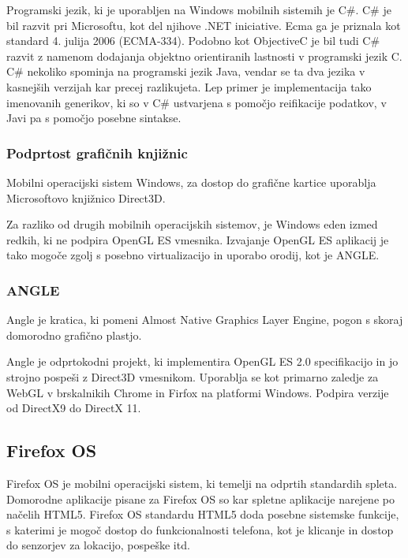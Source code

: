 Programski jezik, ki je uporabljen na Windows mobilnih sistemih je C\#. C\# je bil razvit pri Microsoftu, kot del njihove .NET iniciative. Ecma ga je priznala kot standard 4. julija 2006 (ECMA-334). Podobno kot ObjectiveC je bil tudi C\# razvit z namenom dodajanja objektno orientiranih lastnosti v programski jezik C. C\# nekoliko spominja na programski jezik Java, vendar se ta dva jezika v kasnejših verzijah kar precej razlikujeta. Lep primer je implementacija tako imenovanih generikov, ki so v C\# ustvarjena s pomočjo reifikacije podatkov, v Javi pa s pomočjo posebne sintakse. 

\subsubsection{Podprtost grafičnih knjižnic}

Mobilni operacijski sistem Windows, za dostop do grafične kartice uporablja Microsoftovo knjižnico Direct3D. %

Za razliko od drugih mobilnih operacijskih sistemov, je Windows eden izmed redkih, ki ne podpira OpenGL ES vmesnika. Izvajanje OpenGL ES aplikacij je tako mogoče zgolj s posebno virtualizacijo in uporabo orodij, kot je ANGLE.

\subsubsection{ANGLE}
Angle \cite{angle} je kratica, ki pomeni Almost Native Graphics Layer Engine, pogon s skoraj domorodno grafično plastjo.

Angle je odprtokodni projekt, ki implementira OpenGL ES 2.0 specifikacijo in jo strojno pospeši z Direct3D vmesnikom. Uporablja se kot primarno zaledje za WebGL v brskalnikih Chrome in Firfox na platformi Windows. Podpira verzije od DirectX9 do DirectX 11.  

\subsection{Firefox OS}

Firefox OS \cite{firefoxos} je mobilni operacijski sistem, ki temelji na odprtih standardih spleta. Domorodne aplikacije pisane za Firefox OS so kar spletne aplikacije narejene po načelih HTML5. Firefox OS standardu HTML5 doda posebne sistemske funkcije, s katerimi je mogoč dostop do funkcionalnosti telefona, kot je klicanje in dostop do senzorjev za lokacijo, pospeške itd.

